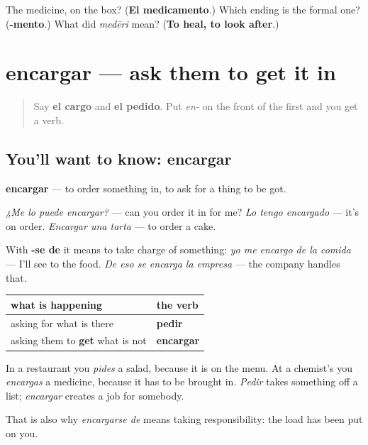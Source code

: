 \begin{tcolorbox}[breakable,colback=teal!4,colframe=teal!35!black,title={Before you move on}]
The medicine, on the box? (\textbf{El medicamento}.) Which ending is the formal one? (\textbf{-mento}.) What did \emph{medēri} mean? (\textbf{To heal, to look after}.)
\end{tcolorbox}
\section[encargar]{encargar — ask them to get it in}

\label{lesson:ES-C457-encargar}



\begin{quote}
Say \textbf{el cargo} and \textbf{el pedido}. Put \emph{en-} on the front of the first and you get a verb.
\end{quote}

\subsection*{You'll want to know: encargar}
\textbf{encargar} — to order something in, to ask for a thing to be got.

\emph{¿Me lo puede encargar?} — can you order it in for me? \emph{Lo tengo encargado} — it's on order. \emph{Encargar una tarta} — to order a cake.

With \textbf{-se de} it means to take charge of something: \emph{yo me encargo de la comida} — I'll see to the food. \emph{De eso se encarga la empresa} — the company handles that.

\begin{grammarlens}[title={Grammar Lens: encargar is not pedir}]
\noindent
\begin{tabularx}{\linewidth}{@{}>{\raggedright\arraybackslash}X>{\raggedright\arraybackslash}X@{}}
\toprule
\textbf{what is happening} & \textbf{the verb} \\
\midrule
asking for what is there & \textbf{pedir} \\
asking them to \textbf{get} what is not & \textbf{encargar} \\
\bottomrule
\end{tabularx}

In a restaurant you \emph{pides} a salad, because it is on the menu. At a chemist's you \emph{encargas} a medicine, because it has to be brought in. \emph{Pedir} takes something off a list; \emph{encargar} creates a job for somebody.

That is also why \emph{encargarse de} means taking responsibility: the load has been put on you.
\end{grammarlens}

